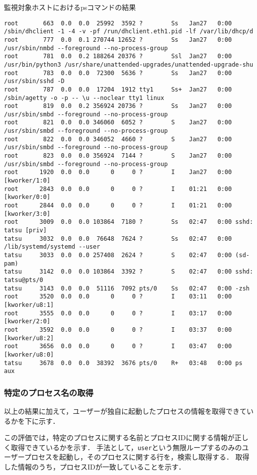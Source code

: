 \begin{itembox}[l]{監視対象ホストにおけるpsコマンドの結果}
\begin{verbatim}
root       663  0.0  0.0  25992  3592 ?        Ss   Jan27   0:00 /sbin/dhclient -1 -4 -v -pf /run/dhclient.eth1.pid -lf /var/lib/dhcp/d
root       777  0.0  0.1 270744 12652 ?        Ss   Jan27   0:00 /usr/sbin/nmbd --foreground --no-process-group
root       781  0.0  0.2 188264 20376 ?        Ssl  Jan27   0:00 /usr/bin/python3 /usr/share/unattended-upgrades/unattended-upgrade-shu
root       783  0.0  0.0  72300  5636 ?        Ss   Jan27   0:00 /usr/sbin/sshd -D
root       787  0.0  0.0  17204  1912 tty1     Ss+  Jan27   0:00 /sbin/agetty -o -p -- \u --noclear tty1 linux
root       819  0.0  0.2 356924 20736 ?        Ss   Jan27   0:00 /usr/sbin/smbd --foreground --no-process-group
root       821  0.0  0.0 346060  6052 ?        S    Jan27   0:00 /usr/sbin/smbd --foreground --no-process-group
root       822  0.0  0.0 346052  4660 ?        S    Jan27   0:00 /usr/sbin/smbd --foreground --no-process-group
root       823  0.0  0.0 356924  7144 ?        S    Jan27   0:00 /usr/sbin/smbd --foreground --no-process-group
root      1920  0.0  0.0      0     0 ?        I    Jan27   0:00 [kworker/1:0]
root      2843  0.0  0.0      0     0 ?        I    01:21   0:00 [kworker/0:0]
root      2844  0.0  0.0      0     0 ?        I    01:21   0:00 [kworker/3:0]
root      3009  0.0  0.0 103864  7180 ?        Ss   02:47   0:00 sshd: tatsu [priv]
tatsu     3032  0.0  0.0  76648  7624 ?        Ss   02:47   0:00 /lib/systemd/systemd --user
tatsu     3033  0.0  0.0 257408  2624 ?        S    02:47   0:00 (sd-pam)
tatsu     3142  0.0  0.0 103864  3392 ?        S    02:47   0:00 sshd: tatsu@pts/0
tatsu     3143  0.0  0.0  51116  7092 pts/0    Ss   02:47   0:00 -zsh
root      3520  0.0  0.0      0     0 ?        I    03:11   0:00 [kworker/u8:1]
root      3555  0.0  0.0      0     0 ?        I    03:17   0:00 [kworker/2:0]
root      3592  0.0  0.0      0     0 ?        I    03:37   0:00 [kworker/u8:2]
root      3656  0.0  0.0      0     0 ?        I    03:47   0:00 [kworker/u8:0]
tatsu     3678  0.0  0.0  38392  3676 pts/0    R+   03:48   0:00 ps aux
    \end{verbatim}
\end{itembox}

\subsubsection{特定のプロセス名の取得}

以上の結果に加えて，ユーザーが独自に起動したプロセスの情報を取得できているかを下に示す．

この評価では，特定のプロセスに関する名前とプロセスIDに関する情報が正しく取得できているかを示す．
手法として，\verb|user|という無限ループするのみのユーザープロセスを起動し，そのプロセスに関する行を，検索し取得する．
取得した情報のうち，プロセスIDが一致していることを示す．

